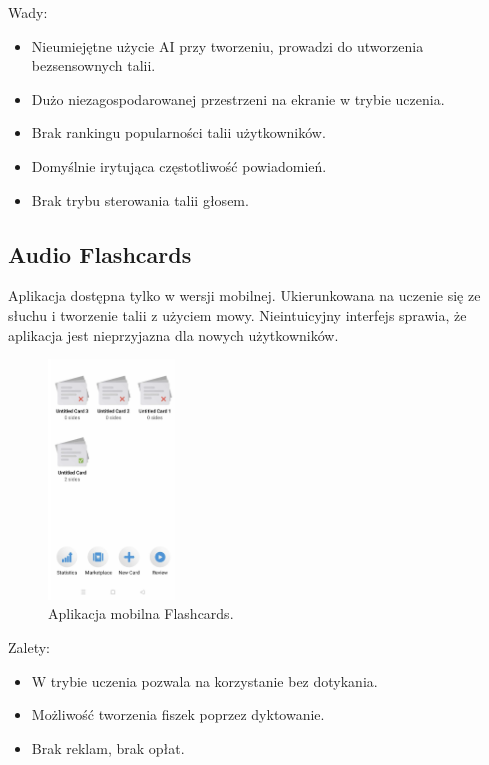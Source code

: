 Wady:
\begin{itemize}
    \item Nieumiejętne użycie AI przy tworzeniu, prowadzi do utworzenia bezsensownych talii.
    \item Dużo niezagospodarowanej przestrzeni na ekranie w trybie uczenia.
    \item Brak rankingu popularności talii użytkowników.
    \item Domyślnie irytująca częstotliwość powiadomień.
    \item Brak trybu sterowania talii głosem.
\end{itemize}

\subsection{Audio Flashcards}

Aplikacja dostępna tylko w wersji mobilnej. Ukierunkowana na uczenie się ze słuchu i tworzenie talii z użyciem mowy. Nieintuicyjny interfejs sprawia, że aplikacja jest nieprzyjazna dla nowych użytkowników.

\begin{figure}[H]
    \centering
    \includegraphics[width=0.3\textwidth]{chapters/chapter_3/flashcards}
    \caption{Aplikacja mobilna Flashcards.}
    \label{img:flashcards}
\end{figure}

Zalety:
\begin{itemize}
    \item W trybie uczenia pozwala na korzystanie bez dotykania.
    \item Możliwość tworzenia fiszek poprzez dyktowanie.
    \item Brak reklam, brak opłat.
\end{itemize}

